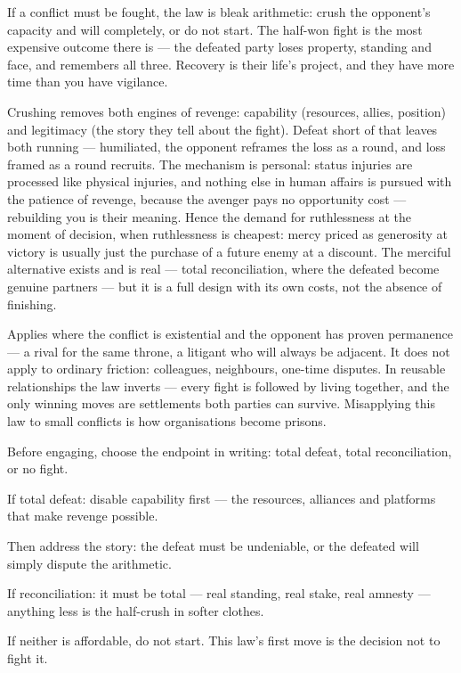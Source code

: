\begin{core}
If a conflict must be fought, the law is bleak arithmetic: crush the opponent's capacity and will completely, or do not start. The half-won fight is the most expensive outcome there is --- the defeated party loses property, standing and face, and remembers all three. Recovery is their life's project, and they have more time than you have vigilance.
\end{core}
\begin{mechanism}
Crushing removes both engines of revenge: capability (resources, allies, position) and legitimacy (the story they tell about the fight). Defeat short of that leaves both running --- humiliated, the opponent reframes the loss as a round, and loss framed as a round recruits. The mechanism is personal: status injuries are processed like physical injuries, and nothing else in human affairs is pursued with the patience of revenge, because the avenger pays no opportunity cost --- rebuilding you is their meaning. Hence the demand for ruthlessness at the moment of decision, when ruthlessness is cheapest: mercy priced as generosity at victory is usually just the purchase of a future enemy at a discount. The merciful alternative exists and is real --- total reconciliation, where the defeated become genuine partners --- but it is a full design with its own costs, not the absence of finishing.
\end{mechanism}
\begin{conditions}
Applies where the conflict is existential and the opponent has proven permanence --- a rival for the same throne, a litigant who will always be adjacent. It does not apply to ordinary friction: colleagues, neighbours, one-time disputes. In reusable relationships the law inverts --- every fight is followed by living together, and the only winning moves are settlements both parties can survive. Misapplying this law to small conflicts is how organisations become prisons.
\end{conditions}
\begin{application}
  \item Before engaging, choose the endpoint in writing: total defeat, total reconciliation, or no fight.
  \item If total defeat: disable capability first --- the resources, alliances and platforms that make revenge possible.
  \item Then address the story: the defeat must be undeniable, or the defeated will simply dispute the arithmetic.
  \item If reconciliation: it must be total --- real standing, real stake, real amnesty --- anything less is the half-crush in softer clothes.
  \item If neither is affordable, do not start. This law's first move is the decision not to fight it.
\end{application}
